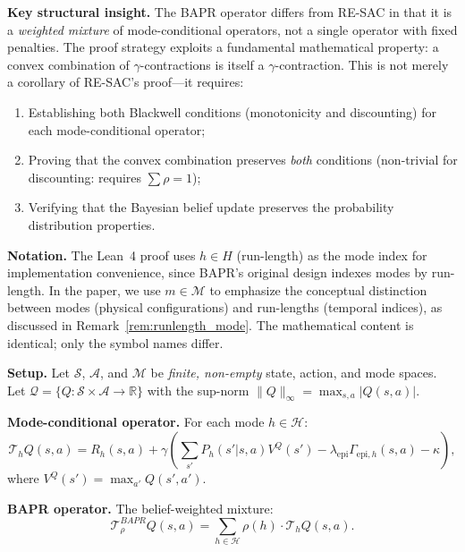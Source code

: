 \medskip
\noindent\textbf{Key structural insight.}
The BAPR operator differs from RE-SAC in that it is a \emph{weighted mixture} of mode-conditional operators, not a single operator with fixed penalties. The proof strategy exploits a fundamental mathematical property: a convex combination of $\gamma$-contractions is itself a $\gamma$-contraction. This is not merely a corollary of RE-SAC's proof---it requires:
\begin{enumerate}
    \item Establishing both Blackwell conditions (monotonicity and discounting) for each mode-conditional operator;
    \item Proving that the convex combination preserves \emph{both} conditions (non-trivial for discounting: requires $\sum \rho = 1$);
    \item Verifying that the Bayesian belief update preserves the probability distribution properties.
\end{enumerate}

\medskip
\noindent\textbf{Notation.}
The Lean~4 proof uses $h \in H$ (run-length) as the mode index for implementation convenience, since BAPR's original design indexes modes by run-length. In the paper, we use $m \in \mathcal{M}$ to emphasize the conceptual distinction between modes (physical configurations) and run-lengths (temporal indices), as discussed in Remark~\ref{rem:runlength_mode}. The mathematical content is identical; only the symbol names differ.

\medskip
\noindent\textbf{Setup.}
Let $\mathcal{S}$, $\mathcal{A}$, and $\mathcal{M}$ be \emph{finite, non-empty} state, action, and mode spaces. Let $\mathcal{Q} = \{Q : \mathcal{S} \times \mathcal{A} \to \mathbb{R}\}$ with the sup-norm $\|Q\|_\infty = \max_{s,a} |Q(s,a)|$.

\textbf{Mode-conditional operator.} For each mode $h \in \mathcal{H}$:
\begin{equation}
    \mathcal{T}_h Q(s,a) = R_h(s,a) + \gamma \left( \sum_{s'} P_h(s'|s,a) V^Q(s') - \lambda_{\text{epi}} \Gamma_{\text{epi},h}(s,a) - \kappa \right),
\end{equation}
where $V^Q(s') = \max_{a'} Q(s',a')$.

\textbf{BAPR operator.} The belief-weighted mixture:
\begin{equation}
    \mathcal{T}^{BAPR}_\rho Q(s,a) = \sum_{h \in \mathcal{H}} \rho(h) \cdot \mathcal{T}_h Q(s,a).
\end{equation}

